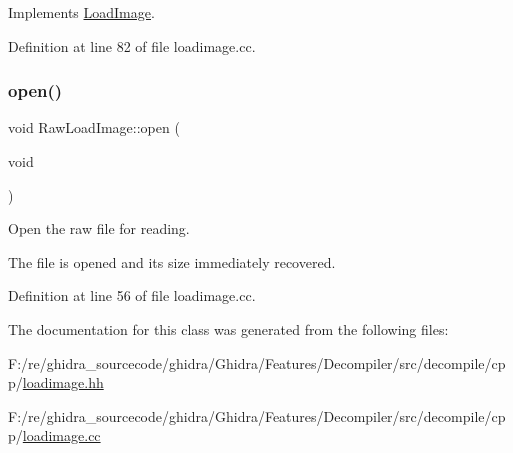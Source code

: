 Implements \mbox{\hyperlink{class_load_image_af00d3957284bf0b4721be0ada5ef4328}{Load\+Image}}.



Definition at line 82 of file loadimage.\+cc.

\mbox{\label{class_raw_load_image_a0863902d12aba3ca097aa8329b27d8e8}} 
\subsubsection{\texorpdfstring{open()}{open()}}
{\footnotesize\ttfamily void Raw\+Load\+Image\+::open (\begin{DoxyParamCaption}\item[{void}]{ }\end{DoxyParamCaption})}



Open the raw file for reading. 

The file is opened and its size immediately recovered. 

Definition at line 56 of file loadimage.\+cc.



The documentation for this class was generated from the following files\+:\begin{DoxyCompactItemize}
\item 
F\+:/re/ghidra\+\_\+sourcecode/ghidra/\+Ghidra/\+Features/\+Decompiler/src/decompile/cpp/\mbox{\hyperlink{loadimage_8hh}{loadimage.\+hh}}\item 
F\+:/re/ghidra\+\_\+sourcecode/ghidra/\+Ghidra/\+Features/\+Decompiler/src/decompile/cpp/\mbox{\hyperlink{loadimage_8cc}{loadimage.\+cc}}\end{DoxyCompactItemize}
